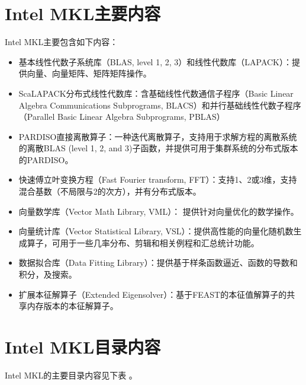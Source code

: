 \documentclass[a4paper,12pt,english]{sphinxmanual}
\begin{document}
\section{Intel MKL主要内容}
\label{\detokenize{intel-mkl/intel-mkl:id1}}
\sphinxAtStartPar
Intel MKL主要包含如下内容：
\begin{itemize}
\item {} 
\sphinxAtStartPar
基本线性代数子系统库（BLAS, level 1, 2, 3）和线性代数库（LAPACK）：提供向量、向量\sphinxhyphen{}矩阵、矩阵\sphinxhyphen{}矩阵操作。

\item {} 
\sphinxAtStartPar
ScaLAPACK分布式线性代数库：含基础线性代数通信子程序（Basic Linear Algebra Communications Subprograms, BLACS）和并行基础线性代数子程序（Parallel Basic Linear Algebra Subprograms, PBLAS）

\item {} 
\sphinxAtStartPar
PARDISO直接离散算子：一种迭代离散算子，支持用于求解方程的离散系统的离散BLAS (level 1, 2, and 3)子函数，并提供可用于集群系统的分布式版本的PARDISO。

\item {} 
\sphinxAtStartPar
快速傅立叶变换方程（Fast Fourier transform, FFT）：支持1、2或3维，支持混合基数（不局限与2的次方），并有分布式版本。

\item {} 
\sphinxAtStartPar
向量数学库（Vector Math Library, VML）： 提供针对向量优化的数学操作。

\item {} 
\sphinxAtStartPar
向量统计库（Vector Statistical Library, VSL）：提供高性能的向量化随机数生成算子，可用于一些几率分布、剪辑和相关例程和汇总统计功能。

\item {} 
\sphinxAtStartPar
数据拟合库（Data Fitting Library）：提供基于样条函数逼近、函数的导数和积分，及搜索。

\item {} 
\sphinxAtStartPar
扩展本征解算子（Extended Eigensolver）：基于FEAST的本征值解算子的共享内存版本的本征解算子。

\end{itemize}


\section{Intel MKL目录内容}
\label{\detokenize{intel-mkl/intel-mkl:id2}}
\sphinxAtStartPar
Intel MKL的主要目录内容见下表 。
\end{document}
